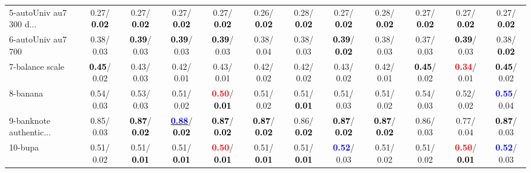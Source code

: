 \begin{table}[h]
\begin{center}
{\begin{tabular}{lc|c|c|c|c|c|c|c|c|c|c}
5-autoUniv au7 300 d... &   0.27/\textcolor{black}{\textbf{  0.02}} &   0.27/\textcolor{black}{\textbf{  0.02}} &   0.27/\textcolor{black}{\textbf{  0.02}} &   0.27/\textcolor{black}{\textbf{  0.02}} &   0.26/\textcolor{black}{\textbf{  0.02}} &   0.28/\textcolor{black}{\textbf{  0.02}} &   0.27/\textcolor{black}{\textbf{  0.02}} &   0.28/\textcolor{black}{\textbf{  0.02}} &   0.27/\textcolor{black}{\textbf{  0.02}} &   0.27/\textcolor{black}{\textbf{  0.02}} &   0.27/\textcolor{black}{\textbf{  0.02}} \\
6-autoUniv au7 700 &   0.38/  0.03 & \textcolor{black}{\textbf{  0.39}}/  0.03 & \textcolor{black}{\textbf{  0.39}}/  0.03 & \textcolor{black}{\textbf{  0.39}}/  0.03 &   0.38/  0.04 &   0.38/  0.03 & \textcolor{black}{\textbf{  0.39}}/\textcolor{black}{\textbf{  0.02}} &   0.38/  0.03 &   0.37/  0.03 & \textcolor{black}{\textbf{  0.39}}/  0.03 &   0.38/\textcolor{black}{\textbf{  0.02}} \\
7-balance scale & \textcolor{black}{\textbf{  0.45}}/  0.02 &   0.43/  0.03 &   0.42/  0.01 &   0.43/  0.01 &   0.42/  0.02 &   0.42/  0.02 &   0.43/  0.02 &   0.42/  0.01 & \textcolor{black}{\textbf{  0.45}}/  0.02 & \textcolor{red}{\textbf{  0.34}}/  0.01 & \textcolor{black}{\textbf{  0.45}}/  0.02 \\ \hline
8-banana &   0.54/  0.03 &   0.53/  0.03 &   0.51/  0.02 & \textcolor{red}{\textbf{  0.50}}/\textcolor{black}{\textbf{  0.01}} &   0.51/  0.02 &   0.51/\textcolor{black}{\textbf{  0.01}} &   0.51/  0.03 &   0.51/  0.02 &   0.54/  0.03 &   0.52/  0.02 & \textcolor{blue}{\textbf{  0.55}}/  0.04 \\
9-banknote authentic... &   0.85/  0.03 & \textcolor{black}{\textbf{  0.87}}/\textcolor{black}{\textbf{  0.02}} & \underline{\textcolor{blue}{\textbf{  0.88}}}/\textcolor{black}{\textbf{  0.02}} & \textcolor{black}{\textbf{  0.87}}/\textcolor{black}{\textbf{  0.02}} & \textcolor{black}{\textbf{  0.87}}/\textcolor{black}{\textbf{  0.02}} &   0.86/\textcolor{black}{\textbf{  0.02}} & \textcolor{black}{\textbf{  0.87}}/\textcolor{black}{\textbf{  0.02}} & \textcolor{black}{\textbf{  0.87}}/\textcolor{black}{\textbf{  0.02}} &   0.86/  0.03 &   0.77/  0.04 & \textcolor{black}{\textbf{  0.87}}/  0.03 \\
10-bupa &   0.51/  0.02 &   0.51/\textcolor{black}{\textbf{  0.01}} &   0.51/\textcolor{black}{\textbf{  0.01}} & \textcolor{red}{\textbf{  0.50}}/\textcolor{black}{\textbf{  0.01}} &   0.51/\textcolor{black}{\textbf{  0.01}} &   0.51/\textcolor{black}{\textbf{  0.01}} & \textcolor{blue}{\textbf{  0.52}}/  0.03 &   0.51/  0.02 &   0.51/  0.02 & \textcolor{red}{\textbf{  0.50}}/\textcolor{black}{\textbf{  0.01}} & \textcolor{blue}{\textbf{  0.52}}/  0.03 \\

\end{tabular}}
\end{center}
\end{table}
